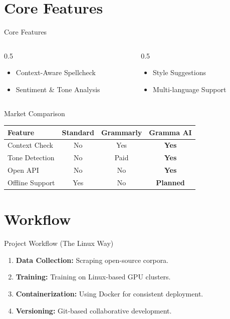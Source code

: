 \documentclass{beamer}
\begin{document}
\section{Core Features}
\begin{frame}{Core Features}
    \begin{columns}
        \begin{column}{0.5\textwidth}
            \begin{itemize}
                \item Context-Aware Spellcheck
                \item Sentiment \& Tone Analysis
            \end{itemize}
        \end{column}
        \begin{column}{0.5\textwidth}
            \begin{itemize}
                \item Style Suggestions
                \item Multi-language Support
            \end{itemize}
        \end{column}
    \end{columns}
\end{frame}

\begin{frame}{Market Comparison}
    \centering
    \begin{tabular}{lccc}
        \toprule
        \textbf{Feature} & \textbf{Standard} & \textbf{Grammarly} & \textbf{Gramma AI} \\
        \midrule
        Context Check & No & Yes & \textbf{Yes} \\
        Tone Detection & No & Paid & \textbf{Yes} \\
        Open API & No & No & \textbf{Yes} \\
        Offline Support & Yes & No & \textbf{Planned} \\
        \bottomrule
    \end{tabular}
\end{frame}

\section{Workflow}
\begin{frame}{Project Workflow (The Linux Way)}
    \begin{enumerate}
        \item \textbf{Data Collection:} Scraping open-source corpora.
        \item \textbf{Training:} Training on Linux-based GPU clusters.
        \item \textbf{Containerization:} Using Docker for consistent deployment.
        \item \textbf{Versioning:} Git-based collaborative development.
    \end{enumerate}
\end{frame}
\end{document}
